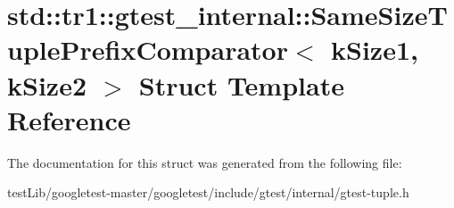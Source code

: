 \hypertarget{structstd_1_1tr1_1_1gtest__internal_1_1SameSizeTuplePrefixComparator}{}\section{std\+:\+:tr1\+:\+:gtest\+\_\+internal\+:\+:Same\+Size\+Tuple\+Prefix\+Comparator$<$ k\+Size1, k\+Size2 $>$ Struct Template Reference}
\label{structstd_1_1tr1_1_1gtest__internal_1_1SameSizeTuplePrefixComparator}


The documentation for this struct was generated from the following file\+:\begin{DoxyCompactItemize}
\item 
test\+Lib/googletest-\/master/googletest/include/gtest/internal/gtest-\/tuple.\+h\end{DoxyCompactItemize}
